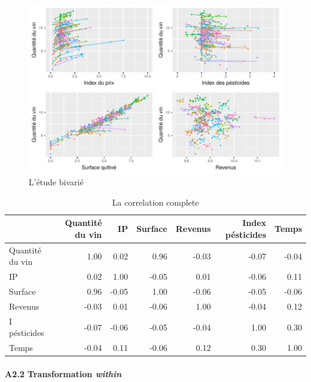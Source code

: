 \documentclass[11pt,]{article}
\let\oldparagraph\paragraph
\renewcommand{\paragraph}[1]{\oldparagraph{#1}\mbox{}}
\begin{document}
\FloatBarrier

\begin{figure}[!htbp]

{\centering \includegraphics{note2pres_files/figure-latex/unnamed-chunk-52-1} 

}

\caption{L'étude bivarié}\label{fig:unnamed-chunk-52}
\end{figure}

\FloatBarrier

\FloatBarrier

\begin{table}[ht]
\centering
\begin{tabular}{l|rrrrrr}
  \hline
 & Quantité du vin & IP & Surface & Revenus & Index pésticides & Temps \\ 
  \hline
Quantité du vin & 1.00 & 0.02 & 0.96 & -0.03 & -0.07 & -0.04 \\ 
  IP & 0.02 & 1.00 & -0.05 & 0.01 & -0.06 & 0.11 \\ 
  Surface & 0.96 & -0.05 & 1.00 & -0.06 & -0.05 & -0.06 \\ 
  Revenus & -0.03 & 0.01 & -0.06 & 1.00 & -0.04 & 0.12 \\ 
  I pésticides & -0.07 & -0.06 & -0.05 & -0.04 & 1.00 & 0.30 \\ 
  Temps & -0.04 & 0.11 & -0.06 & 0.12 & 0.30 & 1.00 \\ 
   \hline
\end{tabular}
\caption{La correlation complete} 
\end{table}

\FloatBarrier

\newpage

\hypertarget{a2.2-transformation-within}{%
\paragraph{\texorpdfstring{A2.2 Transformation
\emph{within}}{A2.2 Transformation within}}\label{a2.2-transformation-within}}
\end{document}
